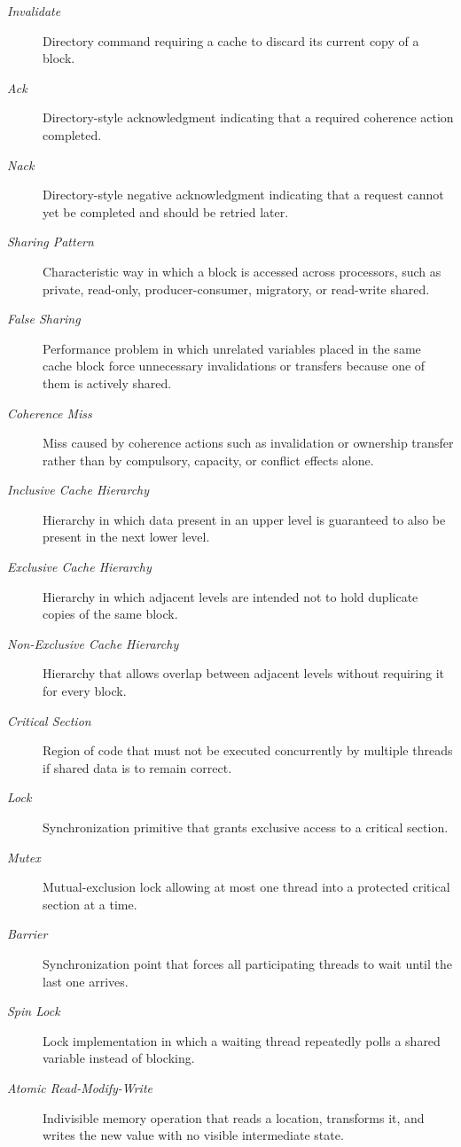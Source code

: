 \begin{description}
    \item[\textit{Invalidate}] Directory command requiring a cache to discard its current copy of a block.
    \item[\textit{Ack}] Directory-style acknowledgment indicating that a required coherence action completed.
    \item[\textit{Nack}] Directory-style negative acknowledgment indicating that a request cannot yet be completed and should be retried later.
    \item[\textit{Sharing Pattern}] Characteristic way in which a block is accessed across processors, such as private, read-only, producer-consumer, migratory, or read-write shared.
    \item[\textit{False Sharing}] Performance problem in which unrelated variables placed in the same cache block force unnecessary invalidations or transfers because one of them is actively shared.
    \item[\textit{Coherence Miss}] Miss caused by coherence actions such as invalidation or ownership transfer rather than by compulsory, capacity, or conflict effects alone.
    \item[\textit{Inclusive Cache Hierarchy}] Hierarchy in which data present in an upper level is guaranteed to also be present in the next lower level.
    \item[\textit{Exclusive Cache Hierarchy}] Hierarchy in which adjacent levels are intended not to hold duplicate copies of the same block.
    \item[\textit{Non-Exclusive Cache Hierarchy}] Hierarchy that allows overlap between adjacent levels without requiring it for every block.
    \item[\textit{Critical Section}] Region of code that must not be executed concurrently by multiple threads if shared data is to remain correct.
    \item[\textit{Lock}] Synchronization primitive that grants exclusive access to a critical section.
    \item[\textit{Mutex}] Mutual-exclusion lock allowing at most one thread into a protected critical section at a time.
    \item[\textit{Barrier}] Synchronization point that forces all participating threads to wait until the last one arrives.
    \item[\textit{Spin Lock}] Lock implementation in which a waiting thread repeatedly polls a shared variable instead of blocking.
    \item[\textit{Atomic Read-Modify-Write}] Indivisible memory operation that reads a location, transforms it, and writes the new value with no visible intermediate state.

\end{description}
